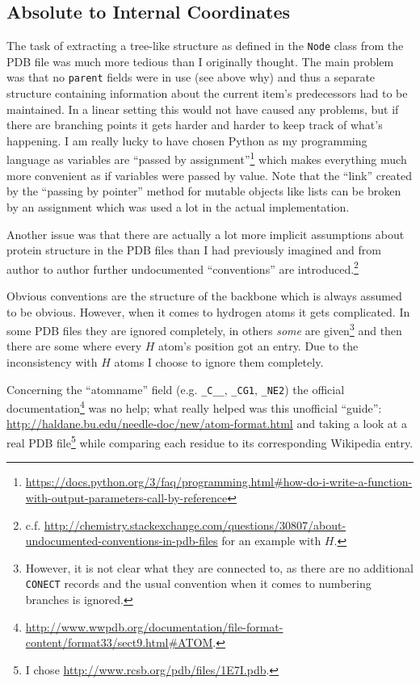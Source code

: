 \subsection{Absolute to Internal Coordinates}
The task of extracting a tree-like structure as defined in the \texttt{Node} class from the PDB file was much more tedious than I originally thought.
The main problem was that no \texttt{parent} fields were in use (see above why) and thus a separate structure containing information about the current item's predecessors had to be maintained.
In a linear setting this would not have caused any problems, but if there are branching points it gets harder and harder to keep track of what's happening. I am really lucky to have chosen Python as my programming language as variables are ``passed by assignment''\footnote{\url{https://docs.python.org/3/faq/programming.html#how-do-i-write-a-function-with-output-parameters-call-by-reference}} which makes everything much more convenient as if variables were passed by value. Note that the ``link'' created by the ``passing by pointer'' method for mutable objects like lists can be broken by an assignment which was used a lot in the actual implementation.

Another issue was that there are actually a lot more implicit assumptions about protein structure in the PDB files than I had previously imagined and from author to author further undocumented ``conventions'' are introduced.\footnote{c.f. \url{http://chemistry.stackexchange.com/questions/30807/about-undocumented-conventions-in-pdb-files} for an example with $H$.}

Obvious conventions are the structure of the backbone which is always assumed to be obvious. However, when it comes to hydrogen atoms it gets complicated. In some PDB files they are ignored completely, in others \textit{some} are given\footnote{However, it is not clear what they are connected to, as there are no additional \texttt{CONECT} records and the usual convention when it comes to numbering branches is ignored.} and then there are some where every $H$ atom's position got an entry. Due to the inconsistency with $H$ atoms I choose to ignore them completely.

Concerning the ``atomname'' field (e.g. \texttt{\_C\_\_}, \texttt{\_CG1}, \texttt{\_NE2}) the official documentation\footnote{\url{http://www.wwpdb.org/documentation/file-format-content/format33/sect9.html\#ATOM}.} was no help; what really helped was this unofficial ``guide'': \url{http://haldane.bu.edu/needle-doc/new/atom-format.html} and taking a look at a real PDB file\footnote{I chose \url{http://www.rcsb.org/pdb/files/1E7I.pdb}.} while comparing each residue to its corresponding Wikipedia entry.

